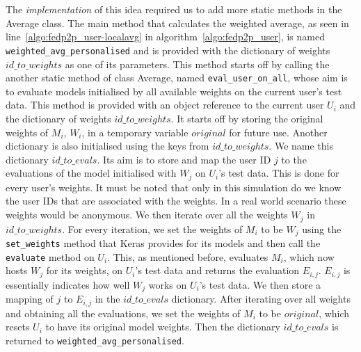 \documentclass[12pt]{article}
\begin{document}
\\\\
The \textit{implementation} of this idea required us to add more static methods in the Average class. The main method that calculates the weighted average, as seen in line~\ref{algo:fedp2p_user-localavg} in algorithm~\ref{algo:fedp2p_user}, is named \texttt{weighted\_avg\_personalised} and is provided with the dictionary of weights $id\_to\_weights$ as one of its parameters. This method starts off by calling the another static method of class Average, named \texttt{eval\_user\_on\_all}, whose aim is to evaluate models initialised by all available weights on the current user's test data. This method is provided with an object reference to the current user $U_i$ and the dictionary of weights $id\_to\_weights$. It starts off by storing the original weights of $M_i$, $W_i$, in a temporary  variable $original$ for future use. Another dictionary is also initialised using the keys from $id\_to\_weights$. We name this dictionary $id\_to\_evals$. Its aim is to store and map the user ID $j$ to the evaluations of the model initialised with $W_j$ on $U_i$'s test data. This is done for every user's weights. It must be noted that only in this simulation do we know the user IDs that are associated with the weights. In a real world scenario these weights would be anonymous. We then iterate over all the weights $W_j$ in $id\_to\_weights$. For every iteration, we set the weights of $M_i$ to be $W_j$ using the \texttt{set\_weights} method that Keras provides for its models and then call the \texttt{evaluate} method on $U_i$. This, as mentioned before, evaluates $M_i$, which now hosts $W_j$ for its weights, on $U_i$'s test data and returns the evaluation $E_{i,j}$. $E_{i,j}$ is essentially indicates how well $W_j$ works on $U_i$'s test data. We then store a mapping of $j$ to $E_{i,j}$ in the $id\_to\_evals$ dictionary. After iterating over all weights and obtaining all the evaluations, we set the weights of $M_i$ to be $original$, which resets $U_i$ to have its original model weights. Then the dictionary $id\_to\_evals$ is returned to \texttt{weighted\_avg\_personalised}.
\\\\
\end{document}
